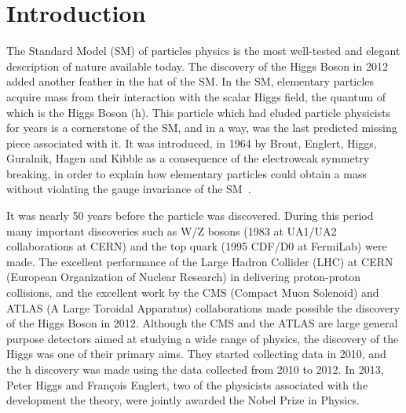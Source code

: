 
%
%

\chapter{Introduction}

The Standard Model (SM) of particles physics is the most well-tested and elegant description of nature available
today. The discovery of the Higgs Boson in 2012~\cite{Aad:2012tfa, Chatrchyan:2012ufa, Chatrchyan:2013lba} added another feather in the hat of the SM. In the SM, elementary particles acquire mass from their interaction with the scalar Higgs field, the quantum of which is the Higgs Boson (h). This particle which had eluded particle physicists for years is a cornerstone of the SM, and in a way, was the last predicted missing piece associated with it. It was introduced, in 1964 by Brout, Englert, Higgs, Guralnik, Hagen and Kibble as a consequence of the electroweak symmetry breaking, in order to explain how elementary particles could obtain a mass without violating the gauge invariance of the SM~\cite{Englert:1964et,Higgs:1964ia,Higgs:1964pj,Guralnik:1964eu}.

It was nearly 50 years before the particle was discovered. During this period many important discoveries such as W/Z bosons (1983 at UA1/UA2 collaborations at CERN) and the top quark (1995 CDF/D0 at FermiLab) were made. The excellent performance of the Large Hadron Collider (LHC) at CERN (European Organization of Nuclear Research) in delivering proton-proton collisions, and the excellent work by the CMS (Compact Muon Solenoid) and ATLAS (A Large Toroidal Apparatus) collaborations made possible the discovery of the Higgs Boson in 2012. Although the CMS and the ATLAS are large general purpose detectors aimed at studying a wide range of physics, the discovery of the Higgs was one of their primary aims. They started collecting data in 2010, and the h discovery was made using the data collected from 2010 to 2012. In 2013, Peter Higgs and François Englert, two of the physicists associated with the development the theory, were jointly awarded the Nobel Prize in Physics.

